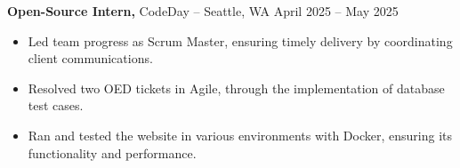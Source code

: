 \documentclass[11pt]{article}       %
\begin{document}

\textbf{Open-Source Intern,} {CodeDay} -- Seattle, WA \hfill April 2025 -- May 2025 \\
\vspace{-9pt}
\begin{itemize}
  \item Led team progress as Scrum Master, ensuring timely delivery by coordinating client communications.
  \item Resolved two OED tickets in Agile, through the implementation of database test cases.
  \item Ran and tested the website in various environments with Docker, ensuring its functionality and performance.
\end{itemize}
\end{document}
